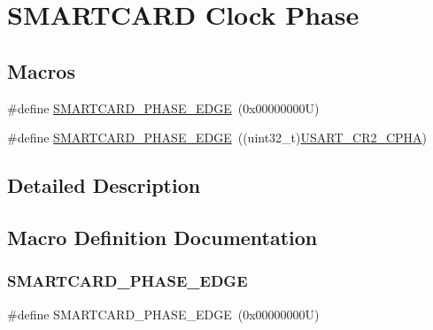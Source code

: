 \hypertarget{group___s_m_a_r_t_c_a_r_d___clock___phase}{}\section{S\+M\+A\+R\+T\+C\+A\+RD Clock Phase}
\label{group___s_m_a_r_t_c_a_r_d___clock___phase}
\subsection*{Macros}
\begin{DoxyCompactItemize}
\item 
\#define \hyperlink{group___s_m_a_r_t_c_a_r_d___clock___phase_ga6b5dfd540b22b8a6cbd956688d17cfce}{S\+M\+A\+R\+T\+C\+A\+R\+D\+\_\+\+P\+H\+A\+S\+E\+\_\+E\+D\+GE}~(0x00000000\+U)
\item 
\#define \hyperlink{group___s_m_a_r_t_c_a_r_d___clock___phase_ga744e424283994e4c92a4db8b247582d6}{S\+M\+A\+R\+T\+C\+A\+R\+D\+\_\+\+P\+H\+A\+S\+E\+\_\+E\+D\+GE}~((uint32\+\_\+t)\hyperlink{group___peripheral___registers___bits___definition_ga362976ce813e58310399d113d2cf09cb}{U\+S\+A\+R\+T\+\_\+\+C\+R2\+\_\+\+C\+P\+HA})
\end{DoxyCompactItemize}


\subsection{Detailed Description}


\subsection{Macro Definition Documentation}
\mbox{\label{group___s_m_a_r_t_c_a_r_d___clock___phase_ga6b5dfd540b22b8a6cbd956688d17cfce}} 
\subsubsection{\texorpdfstring{S\+M\+A\+R\+T\+C\+A\+R\+D\+\_\+\+P\+H\+A\+S\+E\+\_\+E\+D\+GE}{SMARTCARD\_PHASE\_1EDGE}}
{\footnotesize\ttfamily \#define S\+M\+A\+R\+T\+C\+A\+R\+D\+\_\+\+P\+H\+A\+S\+E\+\_\+E\+D\+GE~(0x00000000\+U)}

